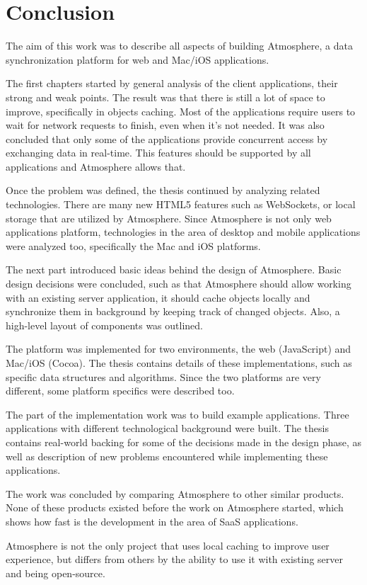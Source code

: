 \section{Conclusion}

The aim of this work was to describe all aspects of building Atmosphere, a data synchronization platform for web and Mac/iOS applications.

The first chapters started by general analysis of the client applications, their strong and weak points. The result was that there is still a lot of space to improve, specifically in objects caching. Most of the applications require users to wait for network requests to finish, even when it's not needed. It was also concluded that only some of the applications provide concurrent access by exchanging data in real-time. This features should be supported by all applications and Atmosphere allows that.

Once the problem was defined, the thesis continued by analyzing related technologies. There are many new HTML5 features such as WebSockets, or local storage that are utilized by Atmosphere. Since Atmosphere is not only web applications platform, technologies in the area of desktop and mobile applications were analyzed too, specifically the Mac and iOS platforms.

The next part introduced basic ideas behind the design of Atmosphere. Basic design decisions were concluded, such as that Atmosphere should allow working with an existing server application, it should cache objects locally and synchronize them in background by keeping track of changed objects. Also, a high-level layout of components was outlined.

The platform was implemented for two environments, the web (JavaScript) and Mac/iOS (Cocoa). The thesis contains details of these implementations, such as specific data structures and algorithms. Since the two platforms are very different, some platform specifics were described too.

The part of the implementation work was to build example applications. Three applications with different technological background were built. The thesis contains real-world backing for some of the decisions made in the design phase, as well as description of new problems encountered while implementing these applications.

The work was concluded by comparing Atmosphere to other similar products. None of these products existed before the work on Atmosphere started, which shows how fast is the development in the area of SaaS applications.

Atmosphere is not the only project that uses local caching to improve user experience, but differs from others by the ability to use it with existing server and being open-source.